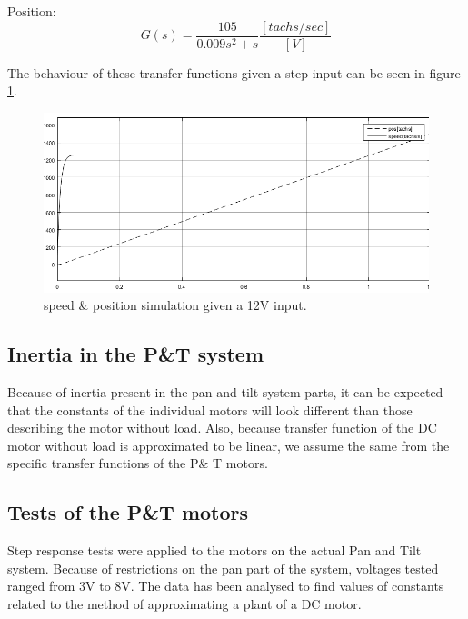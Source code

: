 Position:
\begin{equation}
G(s)=\frac{105}{0.009s^2+s} \frac{[tachs/sec]}{[V]}
\end{equation}

The behaviour of these transfer functions given a step input can be seen in figure \ref{fig:SpeedPosSim12V}.

\begin{figure}[h!]
\centering
\includegraphics[scale=0.6]{Billeder/SpeedPosSim12V.png}
\caption{speed \& position simulation given a 12V input.}
\label{fig:SpeedPosSim12V}
\end{figure}

\subsection{Inertia in the P\&T system}
Because of inertia present in the pan and tilt system parts, it can be expected that the constants of the individual motors will look different than those describing the motor without load. Also, because transfer function of the DC motor without load is approximated to be linear, we assume the same from the specific transfer functions of the P\& T motors.

\subsection{Tests of the P\&T motors}
Step response tests were applied to the motors on the actual Pan and Tilt system. Because of restrictions on the pan part of the system, voltages tested ranged from 3V to 8V. The data has been analysed to find values of constants related to the method of approximating a plant of a DC motor.

